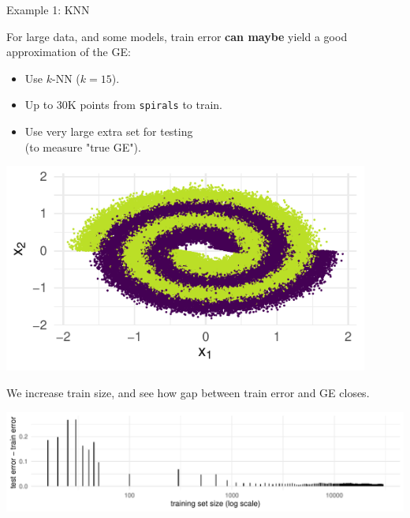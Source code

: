 \documentclass[11pt,compress,t,notes=noshow, xcolor=table]{beamer}
\begin{document}
\begin{vbframe}{Example 1: KNN}

For large data, and some models, train error \textbf{can maybe} yield 
a good approximation of the GE:

\begin{minipage}[c]{0.6\textwidth}
\begin{itemize}
  \small
\item Use $k$-NN ($k = 15$).
\item Up to 30K points from \texttt{spirals} to train.
\item Use very large extra set for testing\\(to measure "true GE").
\end{itemize}
\end{minipage}%
\begin{minipage}[c]{0.05\textwidth}
  \phantom{foo}
\end{minipage}%
\begin{minipage}[c]{0.35\textwidth}
  \includegraphics[width = 0.9\textwidth]{figure/eval_delta_train_test_err_data}
\end{minipage}%

\vfill

\small


\vfill

We increase train size, and see how gap between train error and GE closes.

\vfill

\includegraphics[width = \textwidth]{figure/eval_delta_train_test_err}


\end{vbframe}
\end{document}
